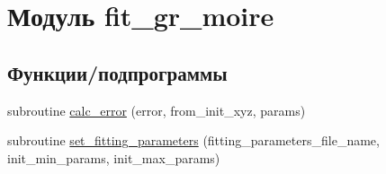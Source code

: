 \hypertarget{namespacefit__gr__moire}{}\section{Модуль fit\+\_\+gr\+\_\+moire}
\label{namespacefit__gr__moire}
\subsection*{Функции/подпрограммы}
\begin{DoxyCompactItemize}
\item 
subroutine \mbox{\hyperlink{namespacefit__gr__moire_aafdddfaa3c2b90a3ab2c09735bc5068b}{calc\+\_\+error}} (error, from\+\_\+init\+\_\+xyz, params)
\item 
subroutine \mbox{\hyperlink{namespacefit__gr__moire_a68bd3fd9fb813f29fb1ba6ad58c05a9d}{set\+\_\+fitting\+\_\+parameters}} (fitting\+\_\+parameters\+\_\+file\+\_\+name, init\+\_\+min\+\_\+params, init\+\_\+max\+\_\+params)
\end{DoxyCompactItemize}
